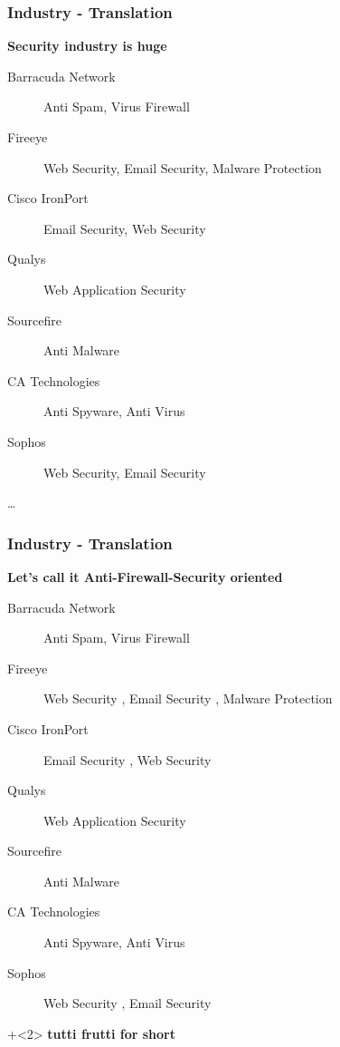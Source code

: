 \documentclass{beamer}
\begin{document}
\begin{frame}\frametitle{Industry - Translation}
\begin{center}
\textbf{Security industry is huge}
\end{center}
\begin{description}
  \item[Barracuda Network] {\color{red}Anti} Spam, Virus {\color{red}Firewall}
  \item[Fireeye] Web {\color{red}Security}, Email {\color{red}Security}, Malware {\color{red}Protection}
  \item[Cisco IronPort] Email {\color{red}Security}, Web {\color{red}Security}
  \item[Qualys] Web Application {\color{red}Security}
  \item[Sourcefire] {\color{red}Anti} Malware
  \item[CA Technologies] {\color{red}Anti} Spyware, {\color{red}Anti} Virus
  \item[Sophos] Web {\color{red}Security}, Email {\color{red}Security}
\end{description}
\ldots
\end{frame}

\begin{frame}\frametitle{Industry - Translation}
\begin{center}
\textbf{Let's call it Anti-Firewall-Security oriented}
\end{center}
\begin{description}
  \item[{\color{white}Barracuda Network}] {\color{red}Anti} {\color{white}Spam,} {\color{white}Virus} {\color{red}Firewall}
  \item[{\color{white}Fireeye}] {\color{white}Web} {\color{red}Security} {\color{white}, Email} {\color{red}Security} {\color{white}, Malware} {\color{red}Protection}
  \item[{\color{white}Cisco IronPort}] {\color{white}Email} {\color{red}Security} {\color{white}, Web} {\color{red}Security}
  \item[{\color{white}Qualys}] {\color{white}Web Application} {\color{red}Security}
  \item[{\color{white}Sourcefire}] {\color{red}Anti} {\color{white}Malware}
  \item[{\color{white}CA Technologies}] {\color{red}Anti} {\color{white}Spyware,} {\color{red}Anti} {\color{white}Virus}
  \item[{\color{white}Sophos}] {\color{white}Web} {\color{red}Security} {\color{white}, Email} {\color{red}Security}
\end{description}
\begin{center}
\onslide+<2> \textbf{{\color{teal}tu}{\color{blue}tti} {\color{orange}fru}{\color{cyan}tti} for short}
\end{center}
\end{frame}
\end{document}
